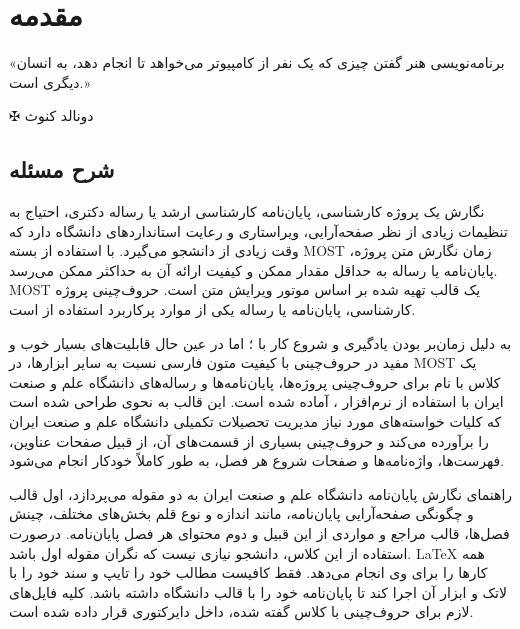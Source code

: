 
\chapter{مقدمه}\label{chapter1}
\thispagestyle{empty}
\epigraph{
«برنامه‌نویسی هنر گفتن چیزی که یک نفر از کامپیوتر می‌خواهد تا انجام دهد، به انسان دیگری است.»
}
{$ \maltese $ {\large دونالد کنوث}}

\section{شرح مسئله}\label{sec1}

 \begin{comment}
نمونه یک توضیح چند خطی در لاتک. محتویات این محیط در  خروجی پی‌دی‌اف تولید شده توسط لاتک درج نمی‌شود.
مثال‌هایی از نحوه استفاده از فونت‌های مختلف موجود در قالب پایان‌نامه علم صنعت.
پیش نمایش 
{\titlefont{پیش نمایش}}
{\iranic{پیش نمایش}}
\textit{پیش نمایش}
\textbf{پیش نمایش}
{\nastaliq پیش نمایش}
{\yagut پیش نمایش}

\end{comment}
نگارش یک پروژه کارشناسی، پایان‌نامه کارشناسی ارشد یا رساله دکتری،  احتیاج به تنظیمات زیادی از نظر صفحه‌آرایی، ویراستاری و رعایت استاندارد‌های دانشگاه دارد که وقت زیادی از دانشجو می‌گیرد.  با استفاده از بسته 
\gls{MOST}
زمان نگارش متن پروژه، پایان‌نامه یا رساله به حداقل مقدار ممکن و کیفیت ارائه آن به حداکثر ممکن می‌رسد.
\gls{MOST}
یک قالب تهیه شده بر اساس موتور ویرایش متن
\XePersian
است.
 حروف‌چینی پروژه کارشناسی، پایان‌نامه یا رساله یکی از موارد پرکاربرد استفاده از 
 \XePersian
  است. 
 \par
به دلیل زمان‌بر بودن یادگیری و شروع کار با 
\XeTeX؛
  اما در عین حال قابلیت‌های بسیار خوب و مفید در حروف‌چینی با کیفیت متون فارسی نسبت به سایر ابزارها،
 در 
\gls{MOST}
یک کلاس با نام 
 برای حروف‌چینی پروژه‌ها، پایان‌نامه‌ها و رساله‌های دانشگاه علم و صنعت ایران با استفاده از نرم‌افزار 
 \XePersian،
آماده شده است. 
 این قالب به نحوی طراحی شده است که کلیات خواسته‌های مورد نیاز مدیریت تحصیلات تکمیلی دانشگاه علم و صنعت ایران  را برآورده می‌کند و حروف‌چینی بسیاری از قسمت‌های آن، از قبیل صفحات عناوین، فهرست‌ها، واژه‌نامه‌ها و صفحات شروع هر فصل، به طور کاملاً خودکار انجام می‌شود.
 \par
 راهنمای نگارش پایان‌نامه دانشگاه علم و صنعت ایران به دو مقوله می‌پردازد، اول قالب و چگونگی صفحه‌آرایی پایان‌نامه، مانند اندازه و نوع قلم بخش‌های مختلف، چینش فصل‌ها، قالب مراجع و مواردی از این قبیل و دوم محتوای هر فصل پایان‌نامه. 
 درصورت استفاده از این کلاس، دانشجو  نیازی نیست که نگران مقوله اول باشد. 
 \LaTeX
  همه کارها را برای وی انجام می‌دهد. فقط کافیست مطالب خود را تایپ و سند خود را با لاتک و ابزار آن اجرا کند تا پایان‌نامه خود را با قالب دانشگاه داشته باشد.
 کلیه فایل‌های لازم برای حروف‌چینی با کلاس گفته شده، داخل دایرکتوری
 \href{https://github.com/m-zakeri/ZMOST/tree/master/latex}{}
 قرار داده شده است.  
 
